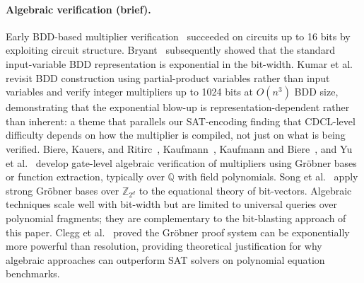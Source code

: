 \documentclass[a4paper]{ceurart}
\begin{document}
\paragraph{Algebraic verification (brief).}
Early BDD-based multiplier verification~\cite{burch1991bdds}
succeeded on circuits up to 16 bits by exploiting circuit
structure. Bryant~\cite{bryant1991complexity} subsequently showed
that the standard input-variable BDD representation is
exponential in the bit-width.
Kumar et al.~\cite{kumar2023bdd} revisit BDD construction using
partial-product variables rather than input variables and verify
integer multipliers up to 1024 bits at $O(n^3)$ BDD size,
demonstrating that the exponential blow-up is representation-dependent
rather than inherent: a theme that parallels our SAT-encoding
finding that CDCL-level difficulty depends on how the multiplier
is compiled, not just on what is being verified.
Biere, Kauers, and Ritirc~\cite{biere2017challenges},
Kaufmann~\cite{kaufmann2020thesis},
Kaufmann and Biere~\cite{kaufmann2021amulet}, and
Yu et al.~\cite{yu2016arithmetic} develop gate-level algebraic
verification of multipliers using Gr\"obner bases or function
extraction, typically over $\mathbb{Q}$ with field polynomials.
Song et al.~\cite{song2024equational} apply strong Gr\"obner bases
over $\mathbb{Z}_{2^d}$ to the equational theory of bit-vectors.
Algebraic techniques scale well with bit-width but are limited to
universal queries over polynomial fragments; they are complementary
to the bit-blasting approach of this paper.
Clegg et al.~\cite{clegg1996groebner} proved the Gr\"obner proof
system can be exponentially more powerful than resolution,
providing theoretical justification for why algebraic approaches
can outperform SAT solvers on polynomial equation benchmarks.
\end{document}
